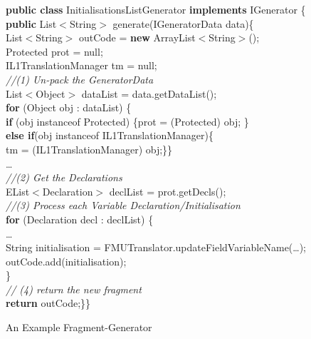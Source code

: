 \documentclass{llncs}%
\begin{document}
\begin{figure}
\centering
\begin{minipage}{0.85\textwidth}
\textbf{public class} InitialisationsListGenerator \textbf{implements} IGenerator \{\\
\hspace*{0.2cm}\textbf{public} List$<$String$>$ generate(IGeneratorData data)\{\\
\hspace*{0.4cm}List$<$String$>$ outCode = \textbf{new} ArrayList$<$String$>$();\\
\hspace*{0.4cm}Protected prot = null;\\
\hspace*{0.4cm}IL1TranslationManager tm = null;\\
\hspace*{0.4cm}\emph{//(1) Un-pack the GeneratorData}\\
\hspace*{0.4cm}List$<$Object$>$ dataList = data.getDataList();\\
\hspace*{0.4cm}\textbf{for} (Object obj : dataList) \{\\
\hspace*{0.6cm}\textbf{if} (obj instanceof Protected) \{prot = (Protected) obj;	\}\\
\hspace*{0.6cm}\textbf{else if}(obj instanceof IL1TranslationManager)\{\\
\hspace*{0.8cm}tm = (IL1TranslationManager) obj;\}\}\\
\hspace*{0.2cm}\ldots\\
\hspace*{0.2cm}\emph{//(2) Get the Declarations}\\
\hspace*{0.2cm}EList$<$Declaration$>$ declList = prot.getDecls();\\
\hspace*{0.2cm}\emph{//(3) Process each Variable Declaration/Initialisation}\\
\hspace*{0.2cm}\textbf{for} (Declaration decl : declList) \{\\
\hspace*{0.4cm}\ldots\\
\hspace*{0.4cm}String initialisation = FMUTranslator.updateFieldVariableName(\ldots);\\
\hspace*{0.4cm}outCode.add(initialisation);\\
\hspace*{0.2cm}\}\\
\hspace*{0.2cm}\emph{// (4) return the new fragment}\\
\hspace*{0.2cm}\textbf{return} outCode;\}\}
\end{minipage}
\caption{An Example Fragment-Generator}
\label{fig:genCode}
\end{figure}
%
%
\end{document}
